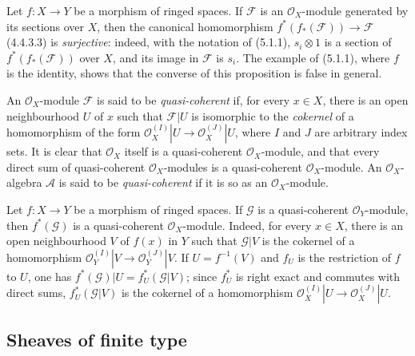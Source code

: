 \begin{env}[5.1.2]
\label{0.5.1.2}
Let $f:X\to Y$ be a morphism of ringed spaces. If $\mathcal{F}$ is an
$\mathcal{O}_X$-module generated by its sections over $X$, then
the canonical homomorphism
$f^*(f_*(\mathcal{F}))\to\mathcal{F}$ (4.4.3.3) is \emph{surjective}:
indeed, with the notation of (5.1.1), $s_i\otimes1$ is a section of
$f^*(f_*(\mathcal{F}))$ over $X$, and its image in $\mathcal{F}$ is
$s_i$. The example of (5.1.1), where $f$ is the identity, shows that the converse of
this proposition is false in general.
\end{env}

\begin{env}[5.1.3]
\label{0.5.1.3}
An $\mathcal{O}_X$-module $\mathcal{F}$ is said to be \emph{quasi-coherent}
if, for every $x\in X$, there is an open neighbourhood $U$ of $x$ such that
$\mathcal{F}|U$ is isomorphic to the \emph{cokernel} of a homomorphism of the
form
$\mathcal{O}_X^{(I)}|U\to\mathcal{O}_X^{(J)}|U$, where $I$ and $J$ are
arbitrary index sets. It is clear that $\mathcal{O}_X$ itself is
a quasi-coherent $\mathcal{O}_X$-module, and that every direct sum of
quasi-coherent $\mathcal{O}_X$-modules is a quasi-coherent
$\mathcal{O}_X$-module. An $\mathcal{O}_X$-algebra $\mathcal{A}$ is said to be
\emph{quasi-coherent} if it is so as an $\mathcal{O}_X$-module.
\end{env}

\begin{env}[5.1.4]
\label{0.5.1.4}
Let $f:X\to Y$ be a morphism of ringed spaces. If $\mathcal{G}$ is a
quasi-coherent $\mathcal{O}_Y$-module, then $f^*(\mathcal{G})$ is a
quasi-coherent $\mathcal{O}_X$-module. Indeed, for every $x\in X$, there is
an open neighbourhood $V$ of $f(x)$ in $Y$ such that $\mathcal{G}|V$ is the
cokernel of a homomorphism
$\mathcal{O}_Y^{(I)}|V\to\mathcal{O}_Y^{(J)}|V$. If $U=f^{-1}(V)$ and
$f_U$ is the restriction of $f$ to $U$, one has
$f^*(\mathcal{G})|U=f_U^*(\mathcal{G}|V)$; since $f_U^*$ is right exact
and commutes with direct sums, $f_U^*(\mathcal{G}|V)$ is the cokernel of a
homomorphism
$\mathcal{O}_X^{(I)}|U\to\mathcal{O}_X^{(J)}|U$.
\end{env}

\subsection{Sheaves of finite type}
\label{subsection:0.5.2}

